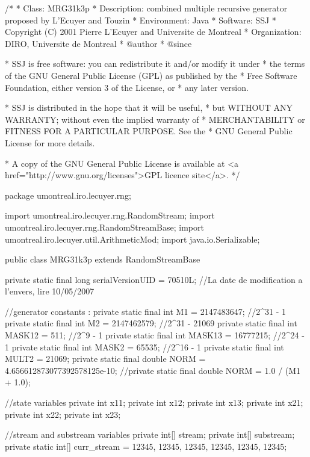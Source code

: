 \begin{code}
\begin{hide}
/*
 * Class:        MRG31k3p
 * Description:  combined multiple recursive generator proposed by L'Ecuyer and Touzin
 * Environment:  Java
 * Software:     SSJ
 * Copyright (C) 2001  Pierre L'Ecuyer and Universite de Montreal
 * Organization: DIRO, Universite de Montreal
 * @author
 * @since

 * SSJ is free software: you can redistribute it and/or modify it under
 * the terms of the GNU General Public License (GPL) as published by the
 * Free Software Foundation, either version 3 of the License, or
 * any later version.

 * SSJ is distributed in the hope that it will be useful,
 * but WITHOUT ANY WARRANTY; without even the implied warranty of
 * MERCHANTABILITY or FITNESS FOR A PARTICULAR PURPOSE.  See the
 * GNU General Public License for more details.

 * A copy of the GNU General Public License is available at
   <a href="http://www.gnu.org/licenses">GPL licence site</a>.
 */
\end{hide}
package umontreal.iro.lecuyer.rng; \begin{hide}


import umontreal.iro.lecuyer.rng.RandomStream;
import umontreal.iro.lecuyer.rng.RandomStreamBase;
import umontreal.iro.lecuyer.util.ArithmeticMod;
import java.io.Serializable;
\end{hide}

public class MRG31k3p extends RandomStreamBase \begin{hide} {

   private static final long serialVersionUID = 70510L;
   //La date de modification a l'envers, lire 10/05/2007

   //generator constants :
   private static final int M1 = 2147483647;    //2^31 - 1
   private static final int M2 = 2147462579;    //2^31 - 21069
   private static final int MASK12 = 511;       //2^9 - 1
   private static final int MASK13 = 16777215;  //2^24 - 1
   private static final int MASK2 = 65535;      //2^16 - 1
   private static final int MULT2 = 21069;
   private static final double NORM = 4.656612873077392578125e-10;
   //private static final double NORM = 1.0 / (M1 + 1.0);

   //state variables
   private int x11;
   private int x12;
   private int x13;
   private int x21;
   private int x22;
   private int x23;

   //stream and substream variables
   private int[] stream;
   private int[] substream;
   private static int[] curr_stream = {12345, 12345, 12345,
                                       12345, 12345, 12345};

}
\end{hide}
\end{code}
